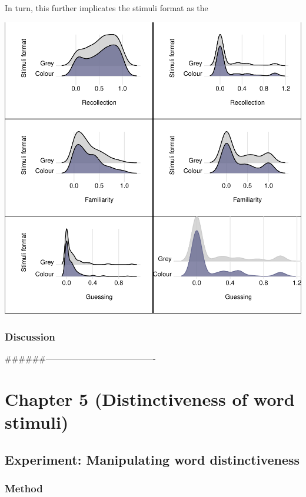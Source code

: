 \documentclass[
  11pt,
]{article}
\begin{document}
In turn, this further implicates the stimuli format as the

\includegraphics{R--Thesis_files/figure-latex/unnamed-chunk-59-1.pdf}

\hypertarget{discussion-3}{%
\subsubsection{Discussion}\label{discussion-3}}

\#\#\#\#\#\#----------------------------------------

\newpage

\hypertarget{chapter-5-distinctiveness-of-word-stimuli}{%
\section{Chapter 5 (Distinctiveness of word
stimuli)}\label{chapter-5-distinctiveness-of-word-stimuli}}

\hypertarget{experiment-manipulating-word-distinctiveness}{%
\subsection{Experiment: Manipulating word
distinctiveness}\label{experiment-manipulating-word-distinctiveness}}

\hypertarget{method-4}{%
\subsubsection{Method}\label{method-4}}
\end{document}
